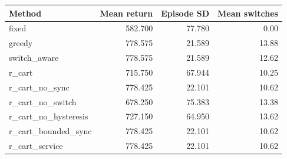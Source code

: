 \begin{tabular}{lrrr}
\toprule
Method & Mean return & Episode SD & Mean switches \\
\midrule
fixed & 582.700 & 77.780 & 0.00 \\
greedy & 778.575 & 21.589 & 13.88 \\
switch\_aware & 778.575 & 21.589 & 12.62 \\
r\_cart & 715.750 & 67.944 & 10.25 \\
r\_cart\_no\_sync & 778.425 & 22.101 & 10.62 \\
r\_cart\_no\_switch & 678.250 & 75.383 & 13.38 \\
r\_cart\_no\_hysteresis & 727.150 & 64.950 & 13.62 \\
r\_cart\_bounded\_sync & 778.425 & 22.101 & 10.62 \\
r\_cart\_service & 778.425 & 22.101 & 10.62 \\
\bottomrule
\end{tabular}
